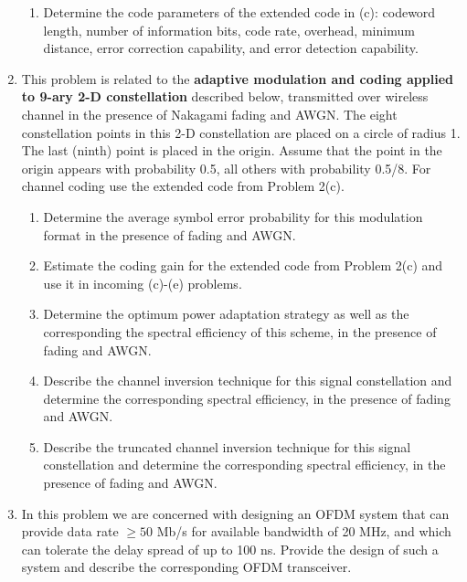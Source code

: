 \documentclass[fleqn]{article}
\begin{document}
\begin{enumerate}
\begin{enumerate}
			\item Determine the code parameters of the extended code in (c): codeword length, number of information bits, code rate, overhead, minimum distance, error correction capability, and error detection capability.
		\end{enumerate}
		
		\item This problem is related to the \textbf{adaptive modulation and coding applied to 9-ary 2-D constellation} described below, transmitted over wireless channel in the presence of Nakagami fading and AWGN. The eight constellation points in this 2-D constellation are placed on a circle of radius 1. The last (ninth) point is placed in the origin. Assume that the point in the origin appears with probability 0.5, all others with probability 0.5/8. For channel coding use the extended code from Problem 2(c).
		
		\begin{enumerate}
			\item Determine the average symbol error probability for this modulation format in the presence of fading and AWGN.
			
			\item Estimate the coding gain for the extended code from Problem 2(c) and use it in incoming (c)-(e) problems.
			
			\item Determine the optimum power adaptation strategy as well as the corresponding the spectral efficiency of this scheme, in the presence of fading and AWGN.
			
			\item Describe the channel inversion technique for this signal constellation and determine the corresponding spectral efficiency, in the presence of fading and AWGN.
			
			\item Describe the truncated channel inversion technique for this signal constellation and determine the corresponding spectral efficiency, in the presence of fading and AWGN.
		\end{enumerate}
		
		\item In this problem we are concerned with designing an OFDM system that can provide data rate $\geq 50$ Mb/s for available bandwidth of 20 MHz, and which can tolerate the delay spread of up to 100 ns. Provide the design of such a system and describe the corresponding OFDM transceiver.
		

\end{enumerate}
\end{document}
